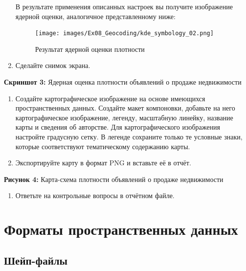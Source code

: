 \documentclass[
  12pt,
]{book}
\providecommand{\tightlist}{%
  \setlength{\itemsep}{0pt}\setlength{\parskip}{0pt}}
\begin{document}
\begin{enumerate}
  В результате применения описанных настроек вы получите изображение ядерной оценки, аналогичное представленному ниже:

  \begin{figure}
  \centering
  \texttt{[image: images/Ex08\_Geocoding/kde\_symbology\_02.png]}
  \caption{Результат ядерной оценки плотности}
  \end{figure}
\item
  Сделайте снимок экрана.
\end{enumerate}

\textbf{Скриншот 3:} Ядерная оценка плотности объявлений о продаже недвижимости

\begin{enumerate}
\def\labelenumi{\arabic{enumi}.}
\setcounter{enumi}{11}
\item
  Создайте картографическое изображение на основе имеющихся пространственных данных. Создайте макет компоновки, добавьте на него картографическое изображение, легенду, масштабную линейку, название карты и сведения об авторстве. Для картографического изображения настройте градусную сетку. В легенде сохраните только те условные знаки, которые соответствуют тематическому содержанию карты.
\item
  Экспортируйте карту в формат PNG и вставьте её в отчёт.
\end{enumerate}

\textbf{Рисунок 4:} Карта-схема плотности объявлений о продаже недвижимости

\begin{enumerate}
\def\labelenumi{\arabic{enumi}.}
\setcounter{enumi}{13}
\tightlist
\item
  Ответьте на контрольные вопросы в отчётном файле.
\end{enumerate}

\hypertarget{appendix-ux441ux43fux440ux430ux432ux43eux447ux43dux44bux435-ux441ux432ux435ux434ux435ux43dux438ux44f}{%
\appendix}


\hypertarget{manual-catalog}{%
\chapter{Форматы пространственных данных}\label{manual-catalog}}

\hypertarget{manual-dataformats-shapefile}{%
\section{Шейп-файлы}\label{manual-dataformats-shapefile}}
\end{document}
